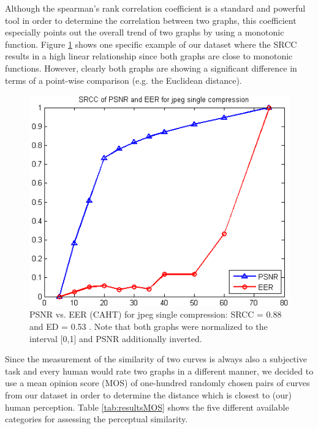 \documentclass[10pt,twocolumn,letterpaper]{article}
\begin{document}
Although the spearman’s rank correlation coefficient is a standard and powerful tool in order to determine the correlation between two graphs, this coefficient especially points out the overall trend of two graphs by using a monotonic function. Figure \ref{fig:corrSRCCproblem} shows one specific example of our dataset where the SRCC results in a high linear relationship since both graphs are close to monotonic functions. However, clearly both graphs are showing a significant difference in terms of a point-wise comparison (e.g. the Euclidean distance).

\begin{figure}[h]
	\begin{center}
		
	\includegraphics[width=1\linewidth]{img/corrSRCCproblem}
\end{center}
	\caption{PSNR vs. EER (CAHT) for jpeg single compression: SRCC = 0.88 and ED = 0.53 . Note that both graphs were normalized to the interval [0,1] and PSNR additionally inverted.}
	\label{fig:corrSRCCproblem}
	
\end{figure}

Since the measurement of the similarity of two curves is always also a subjective task and every human would rate two graphs in a different manner, we decided to use a mean opinion score (MOS) of one-hundred randomly chosen pairs of curves from our dataset in order to determine the distance which is closest to (our) human perception. Table \ref{tab:resultsMOS} shows the five different available categories for assessing the perceptual similarity.
\end{document}
